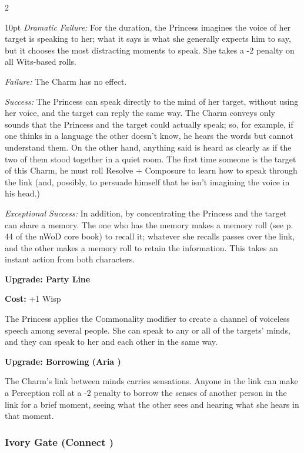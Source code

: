 \begin{multicols}{2}
\begin{myindentpar}{10pt}    \emph{Dramatic Failure:} For the duration, the Princess imagines the voice of her target is speaking to her; what it says is what she generally expects him to say, but it chooses the most distracting moments to speak. She takes a -2 penalty on all Wits-based rolls.
    
	\emph{Failure:} The Charm has no effect.
    
	\emph{Success:} The Princess can speak directly to the mind of her target, without using her voice, and the target can reply the same way. The Charm conveys only sounds that the Princess and the target could actually speak; so, for example, if one thinks in a language the other doesn't know, he hears the words but cannot understand them. On the other hand, anything said is heard as clearly as if the two of them stood together in a quiet room. The first time someone is the target of this Charm, he must roll Resolve + Composure to learn how to speak through the link (and, possibly, to persuade himself that he isn't imagining the voice in his head.)
    
	\emph{Exceptional Success:} In addition, by concentrating the Princess and the target can share a memory. The one who has the memory makes a memory roll (see p. 44 of the nWoD core book) to recall it; whatever she recalls passes over the link, and the other makes a memory roll to retain the information. This takes an instant action from both characters.

\textbf{Upgrade: Party Line}

\noindent \textbf{Cost:} +1 Wisp

The Princess applies the Commonality modifier to create a channel of voiceless speech among several people. She can speak to any or all of the targets' minds, and they can speak to her and each other in the same way. 

\textbf{Upgrade: Borrowing (Aria \textbullet\textbullet)}

The Charm's link between minds carries sensations. Anyone in the link can make a Perception roll at a -2 penalty to borrow the senses of another person in the link for a brief moment, seeing what the other sees and hearing what she hears in that moment.\end{myindentpar}

\subsubsection*{Ivory Gate (Connect \textbullet\textbullet\textbullet)}


\end{multicols}
